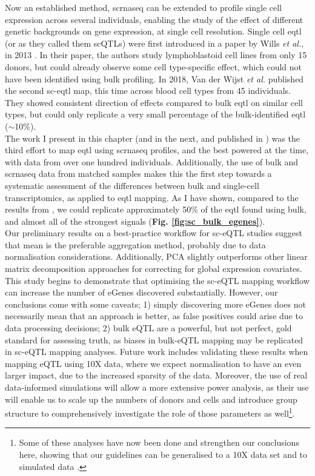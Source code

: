 Now an established method, \gls{scrnaseq} can be extended to profile single cell expression across several individuals, enabling the study of the effect of different genetic backgrounds on gene expression, at single cell resolution.
Single cell \gls{eqtl} (or as they called them scQTLs) were first introduced in a paper by Wills \textit{et al.}, in 2013 \cite{wills2013single}.
In their paper, the authors study lymphoblastoid cell lines from only 15 donors, but could already observe some cell type-specific effect, which could not have been identified using bulk profiling.
In 2018, Van der Wijst \textit{et al.} \cite{van2018single} published the second sc-\gls{eqtl} map, this time across blood cell types from 45 individuals.
They showed consistent direction of effects compared to bulk \gls{eqtl} on similar cell types, but could only replicate a very small percentage of the bulk-identified \gls{eqtl} ($\sim$10\%). \\

The work I present in this chapter (and in the next, and published in \cite{cuomo2020single}) was the third effort to map \gls{eqtl} using \gls{scrnaseq} profiles, and the best powered at the time, with data from over one hundred individuals.
Additionally, the use of bulk and \gls{scrnaseq} data from matched samples makes this the first step towards a systematic assessment of the differences between bulk and single-cell transcriptomics, as applied to \gls{eqtl} mapping.
As I have shown, compared to the results from \cite{van2018single}, we could replicate approximately 50\% of the \gls{eqtl} found using bulk, and almost all of the strongest signals (\textbf{Fig. \ref{fig:sc_bulk_egenes}}). \\

Our preliminary results on a best-practice workflow for sc-eQTL studies suggest that mean is the preferable aggregation method, probably due to data normalisation considerations.
Additionally, PCA slightly outperforms other linear matrix decomposition approaches for correcting for global expression covariates.
This study begins to demonstrate that optimising the sc-eQTL mapping workflow can increase the number of eGenes discovered substantially. 
However, our conclusions come with some caveats; 1) simply discovering more eGenes does not necessarily mean that an approach is better, as false positives could arise due to data processing decisions; 2) bulk eQTL are a powerful, but not perfect, gold standard for assessing truth, as biases in bulk-eQTL mapping may be replicated in sc-eQTL mapping analyses.
Future work includes validating these results when mapping eQTL using 10X data, where we expect normalisation to have an even larger impact, due to the increased sparsity of the data.
Moreover, the use of real data-informed simulations will allow a more extensive power analysis, as their use will enable us to scale up the numbers of donors and cells and introduce group structure to comprehensively investigate the role of those parameters as well\footnote{Some of these analyses have now been done and strengthen our conclusions here, showing that our guidelines can be generalised to a 10X data set and to simulated data \cite{cuomo2021optimising}.}. \\

